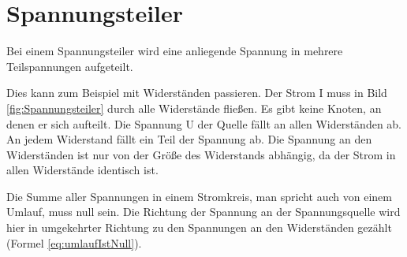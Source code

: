 \section{Spannungsteiler}

Bei einem Spannungsteiler wird eine anliegende Spannung in mehrere Teilspannungen aufgeteilt.

Dies kann zum Beispiel mit Widerständen passieren. Der Strom I muss in Bild \ref{fig:Spannungsteiler} durch alle Widerstände fließen. Es gibt keine Knoten, an denen er sich aufteilt. Die Spannung U der Quelle fällt an allen Widerständen ab. An jedem Widerstand fällt ein Teil der Spannung ab. Die Spannung an den Widerständen ist nur von der Größe des Widerstands abhängig, da der Strom in allen Widerstände identisch ist.

Die Summe aller Spannungen in einem Stromkreis, man spricht auch von einem Umlauf, muss null sein. Die Richtung der Spannung an der Spannungsquelle wird hier in umgekehrter Richtung zu den Spannungen an den Widerständen gezählt (Formel \ref{eq:umlaufIstNull}).

